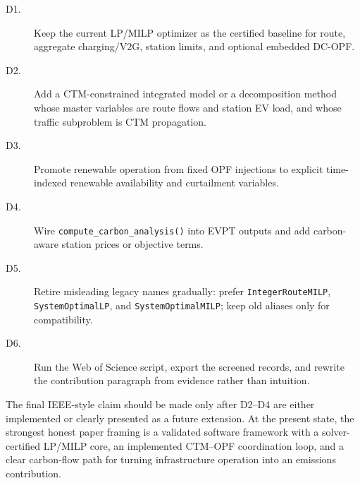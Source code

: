 \begin{description}
  \item[D1.] Keep the current LP/MILP optimizer as the certified baseline for
  route, aggregate charging/V2G, station limits, and optional embedded DC-OPF.
  \item[D2.] Add a CTM-constrained integrated model or a decomposition method
  whose master variables are route flows and station EV load, and whose traffic
  subproblem is CTM propagation.
  \item[D3.] Promote renewable operation from fixed OPF injections to explicit
  time-indexed renewable availability and curtailment variables.
  \item[D4.] Wire \texttt{compute\_carbon\_analysis()} into EVPT outputs and add
  carbon-aware station prices or objective terms.
  \item[D5.] Retire misleading legacy names gradually: prefer
  \texttt{IntegerRouteMILP}, \texttt{SystemOptimalLP}, and
  \texttt{SystemOptimalMILP}; keep old aliases only for compatibility.
  \item[D6.] Run the Web of Science script, export the screened records, and
  rewrite the contribution paragraph from evidence rather than intuition.
\end{description}

The final IEEE-style claim should be made only after D2--D4 are either
implemented or clearly presented as a future extension. At the present state,
the strongest honest paper framing is a validated software framework with a
solver-certified LP/MILP core, an implemented CTM--OPF coordination loop, and a
clear carbon-flow path for turning infrastructure operation into an emissions
contribution.
